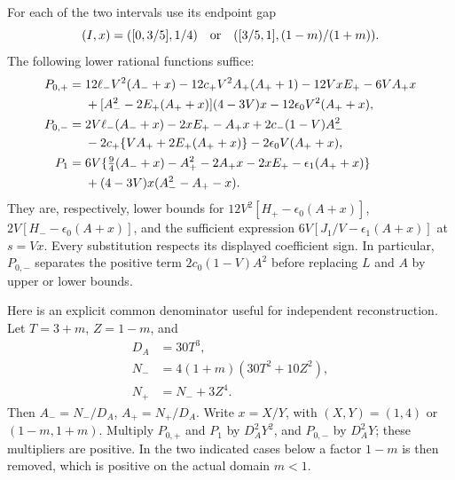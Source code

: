 \documentclass[11pt]{article}
\theoremstyle{remark}\newtheorem{remark}[theorem]{Remark}
\numberwithin{equation}{section}
\begin{document}
For each of the two intervals use its endpoint gap
\[
 (I,x)=([0,3/5],1/4)\quad\hbox{or}\quad
 ([3/5,1],(1-m)/(1+m)).
\]
The following lower rational functions suffice:
\begin{align}
 P_{0,+}={}&12\ell_-V^2(A_-+x)-12c_+V^2A_+(A_++1)
 -12VxE_+-6VA_+x\notag\\
 &+[A_-^2-2E_+(A_++x)](4-3V)x
 -12\epsilon_0V^2(A_++x),\label{eq:I16-polyplus}\\
 P_{0,-}={}&2V\ell_-(A_-+x)-2xE_+-A_+x
 +2c_-(1-V)A_-^2\notag\\
 &-2c_+\{VA_++2E_+(A_++x)\}
 -2\epsilon_0V(A_++x),\label{eq:I16-polyminus}\\
 P_1={}&6V\{\tfrac94(A_-+x)-A_+^2-2A_+x-2xE_+
                         -\epsilon_1(A_++x)\}\notag\\
 &+(4-3V)x(A_-^2-A_+-x).\label{eq:I16-polyone}
\end{align}
They are, respectively, lower bounds for
$12V^2[H_+-\epsilon_0(A+x)]$,
$2V[H_--\epsilon_0(A+x)]$, and the sufficient expression
$6V[J_1/V-\epsilon_1(A+x)]$ at $s=Vx$.
Every substitution respects its displayed coefficient sign. In particular,
$P_{0,-}$ separates the positive term $2c_0(1-V)A^2$ before replacing
$L$ and $A$ by upper or lower bounds.

Here is an explicit common denominator useful for independent reconstruction.
Let $T=3+m$, $Z=1-m$, and
\begin{align*}
 D_A&=30T^3,\\
 N_-&=4(1+m)(30T^2+10Z^2),\\
 N_+&=N_-+3Z^4.
\end{align*}
Then $A_-=N_-/D_A$, $A_+=N_+/D_A$. Write $x=X/Y$, with
$(X,Y)=(1,4)$ or $(1-m,1+m)$. Multiply $P_{0,+}$ and $P_1$ by
$D_A^2Y^2$, and $P_{0,-}$ by $D_A^2Y$; these multipliers are positive.
In the two indicated cases below a factor $1-m$ is then removed, which is
positive on the actual domain $m<1$.
\end{document}
